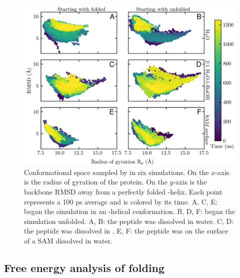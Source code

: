 \begin{figure}
    \center
    \includegraphics[width=\double]{figures-helix/combined_rgyr_v_rmsd.png}
    \caption{
        Conformational space sampled by \pep{} in six simulations. 
        On the $x$-axis is the radius of gyration of the protein. 
        On the $y$-axis is the backbone RMSD away from a perfectly folded \textalpha{}-helix. 
        Each point represents a 100 ps average and is colored by its time. 
        A, C, E: \pep{} began the simulation in an \textalpha{}-helical conformation. 
        B, D, F: \pep{} began the simulation unfolded. 
        A, B: the peptide was dissolved in water. 
        C, D: the peptide was dissolved in \tbawat{}. 
        E, F: the peptide was on the surface of a SAM dissolved in water.
    }
    \label{fig:helix-rgyr_v_rmsd}
\end{figure}

\subsection{Free energy analysis of folding}

